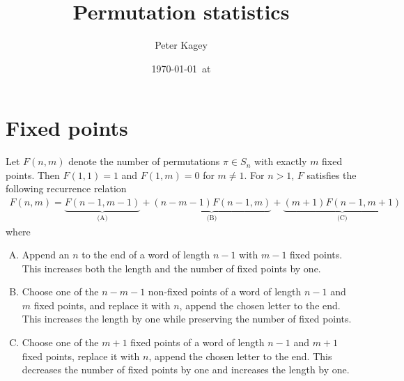 \documentclass{article}
\begin{document}

\title{Permutation statistics}
\author{Peter Kagey}
\date{\today\ at \currenttime}

\maketitle
\section{Fixed points}
Let $F(n,m)$ denote the number of permutations $\pi \in S_n$ with exactly $m$
fixed points. Then $F(1,1) = 1$ and $F(1,m) = 0$ for $m \neq 1$.
For $n > 1$, $F$ satisfies the following recurrence relation \begin{align}
  F(n, m) =
    \underbrace{F(n - 1, m-1)}_{\text{(A)}} +
    \underbrace{(n - m - 1)F(n - 1, m)}_{\text{(B)}} +
    \underbrace{(m + 1)F(n-1, m + 1)}_{\text{(C)}}
\end{align} where \begin{enumerate}[(A)]
  \item Append an $n$ to the end of a word of length $n-1$ with $m-1$ fixed
  points. This increases both the length and the number of fixed points by one.
  \item Choose one of the $n - m - 1$ non-fixed points of a word of length $n-1$ and $m$
  fixed points, and replace it with $n$, append the chosen letter to the end.
  This increases the length by one while preserving the number of fixed points.
  \item Choose one of the $m + 1$ fixed points of a word of length $n-1$ and $m+1$
  fixed points, replace it with $n$, append the chosen letter to the end. This
  decreases the number of fixed points by one and increases the length by one.
\end{enumerate}
\end{document}
